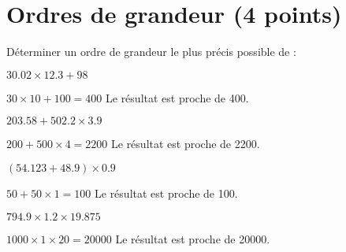\section{Ordres de grandeur (4 points)}

Déterminer un ordre de grandeur le plus précis possible de :

\begin{questions}
	\question[1] $\num{30.02} \times \num{12.3} + 98$
	\begin{solution}
		$\num{30}	\times 10 + 100 = 400	$
		Le résultat est proche de 400.
	\end{solution}
	\question[1] $\num{203.58} + \num{502.2} \times \num{3.9}$
	\begin{solution}
		$\num{200}	+ 500 \times 4 = 2200	$
		Le résultat est proche de 2200.
	\end{solution}
	\question[1] $(\num{54.123} + \num{48.9}) \times \num{0.9}$
	\begin{solution}
		$\num{50}	+ 50 \times 1 = 100	$
		Le résultat est proche de 100.
	\end{solution}

	\question[1] $\num{794.9} \times \num{1.2} \times \num{19.875}$
	\begin{solution}
		$\num{1000}	\times 1 \times 20 = \num{20000}	$
		Le résultat est proche de \num{20000}.
	\end{solution}
\end{questions}